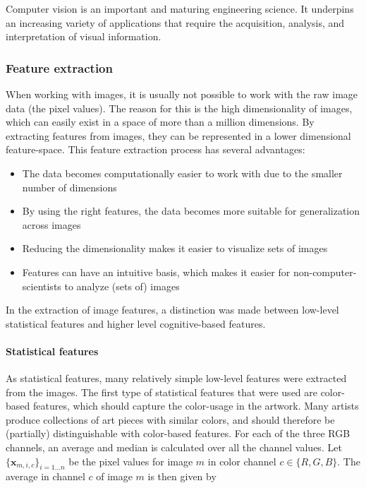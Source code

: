 Computer vision is an important and maturing engineering science. It underpins an increasing variety of applications that require the acquisition, analysis, and interpretation of visual information.

\subsubsection{Feature extraction}
When working with images, it is usually not possible to work with the raw image data (the pixel values). The reason for this is the high dimensionality of images, which can easily exist in a space of more than a million dimensions. By extracting features from images, they can be represented in a lower dimensional feature-space.  This feature extraction process has several advantages:
\begin{itemize}
\item The data becomes computationally easier to work with due to the smaller number of dimensions
\item By using the right features, the data becomes more suitable for generalization across images
\item Reducing the dimensionality makes it easier to visualize sets of images
\item Features can have an intuitive basis, which makes it easier for non-computer-scientists to analyze (sets of) images
\end{itemize}

In the extraction of image features, a distinction was made between low-level statistical features and higher level cognitive-based features.

\paragraph{Statistical features}
As statistical features, many relatively simple low-level features were extracted from the images.
The first type of statistical features that were used are color-based features, which should capture the color-usage in the artwork. Many artists produce collections of art pieces with similar colors, and should therefore be (partially) distinguishable with color-based features. For each of the three RGB channels, an average and median is calculated over all the channel values. Let $\{\mathbf{x}_{m,i,c} \}_{i=1\dots n}$ be the pixel values for image $m$ in color channel $c \in \{R,G,B \}$. The average in channel $c$ of image $m$ is then given by 

